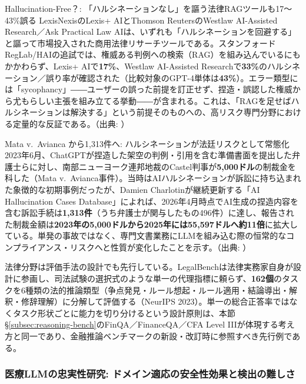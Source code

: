 \begin{casestudy}{Hallucination-Free？: 「ハルシネーションなし」を謳う法律RAGツールも17〜43\%誤る}
LexisNexisのLexis+ AIとThomson ReutersのWestlaw AI-Assisted Research／Ask Practical Law AIは、いずれも「ハルシネーションを回避する」と謳って市場投入された商用法律リサーチツールである。スタンフォードRegLab/HAIの追試では、権威ある判例への検索（RAG）を組み込んでいるにもかかわらず、Lexis+ AIで\textbf{17\%}、Westlaw AI-Assisted Researchで\textbf{33\%}のハルシネーション／誤り率が確認された（比較対象のGPT-4単体は\textbf{43\%}）。エラー類型には「sycophancy」――ユーザーの誤った前提を訂正せず、捏造・誤認した権威から尤もらしい主張を組み立てる挙動――が含まれる。これは、「RAGを足せばハルシネーションは解決する」という前提そのものへの、高リスク専門分野における定量的な反証である。（出典: \cite{y05magesh2025hallucinationfree}）
\end{casestudy}

\begin{casestudy}{Mata v.\ Avianca から1,313件へ: ハルシネーションが法廷リスクとして常態化}
2023年6月、ChatGPTが捏造した架空の判例・引用を含む準備書面を提出した弁護士らに対し、南部ニューヨーク連邦地裁のCastel判事が\textbf{5,000ドル}の制裁金を科した（Mata v.\ Avianca事件）。当時はAIハルシネーションが訴訟に持ち込まれた象徴的な初期事例だったが、Damien Charlotinが継続更新する「AI Hallucination Cases Database」によれば、2026年4月時点でAI生成の捏造内容を含む訴訟手続は\textbf{1,313件}（うち弁護士が関与したもの496件）に達し、報告された制裁金額は\textbf{2023年の5,000ドルから2025年には55,597ドルへ約11倍}に拡大している。単発の事故ではなく、専門文書業務にLLMを組み込む際の恒常的なコンプライアンス・リスクへと性質が変化したことを示す。（出典: \cite{y05mataavianca2023,y05charlotin2026database}）
\end{casestudy}

法律分野は評価手法の設計でも先行している。LegalBenchは法律実務家自身が設計に参画し、司法試験の選択式のような単一の代理指標に頼らず、\textbf{162個}のタスクを6種類の法的推論類型（争点発見・ルール想起・ルール適用・結論導出・解釈・修辞理解）に分解して評価する（NeurIPS 2023）。単一の総合正答率ではなくタスク形状ごとに能力を切り分けるという設計原則は、本節\S\ref{subsec:reasoning-bench}のFinQA／FinanceQA／CFA Level IIIが体現する考え方と同一であり、金融推論ベンチマークの新設・改訂時に参照すべき先行例である\cite{y05legalbench2023}。

\subsubsection{医療LLMの忠実性研究: ドメイン適応の安全性効果と検出の難しさ}

